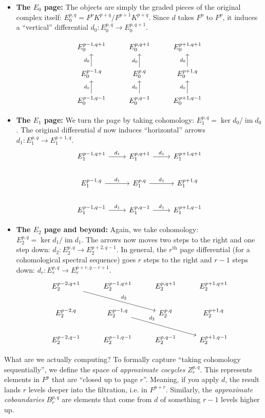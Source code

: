\documentclass[11pt]{article}
\newcommand{\image}{\operatorname{im}}
\theoremstyle{definition}
\numberwithin{theorem}{section} %
\numberwithin{equation}{section} %
\begin{document}
\begin{itemize}

\item \textbf{The $E_0$ page:} The objects are simply the graded pieces of the original complex itself: $E_0^{p,q} = F^pK^{p+q}/F^{p+1}K^{p+q}$. Since $d$ takes $F^p$ to $F^p$, it induces a ``vertical'' differential $d_0: E_0^{p,q} \to E_0^{p,q+1}$.

\[\begin{tikzcd}
E_0^{p-1, q+1} & E_0^{p, q+1} & E_0^{p+1, q+1} \\
E_0^{p-1, q} \arrow[u, "d_0"] & E_0^{p, q} \arrow[u, "d_0"] & E_0^{p+1, q} \arrow[u, "d_0"] \\
E_0^{p-1, q-1} \arrow[u, "d_0"] & E_0^{p, q-1} \arrow[u, "d_0"] & E_0^{p+1, q-1} \arrow[u, "d_0"]
\end{tikzcd}\]

\item \textbf{The $E_1$ page:} We turn the page by taking cohomology: $E_1^{p,q} = \ker d_0 / \image d_0$. The original differential $d$ now induces ``horizontal'' arrows $d_1: E_1^{p,q} \to E_1^{p+1, q}$. 
\[\begin{tikzcd}
E_1^{p-1, q+1} \arrow[r, "d_1"] & E_1^{p, q+1} \arrow[r, "d_1"] & E_1^{p+1, q+1} \\
E_1^{p-1, q} \arrow[r, "d_1"] & E_1^{p, q} \arrow[r, "d_1"] & E_1^{p+1, q} \\
E_1^{p-1, q-1} \arrow[r, "d_1"] & E_1^{p, q-1} \arrow[r, "d_1"] & E_1^{p+1, q-1}
\end{tikzcd}\]

\item \textbf{The $E_2$ page and beyond:} Again, we take cohomology: $E_2^{p,q} = \ker d_1 / \image d_1$. The arrows now moves two steps to the right and one step down: $d_2: E_2^{p,q} \to E_2^{p+2, q-1}$. In general, the $r^\text{th}$ page differential (for a cohomological spectral sequence) goes $r$ steps to the right and $r-1$ steps down: $d_r: E_r^{p,q} \to E_r^{p+r, q-r+1}$.
\[\begin{tikzcd}
E_2^{p-2, q+1} \arrow[drr, "d_2"] & E_2^{p-1, q+1} & E_2^{p, q+1} & E_2^{p+1, q+1} \\
E_2^{p-2, q} & E_2^{p-1, q} \arrow[drr, "d_2" near start] & E_2^{p, q} & E_2^{p+1, q} \\
E_2^{p-2, q-1} & E_2^{p-1, q-1} & E_2^{p, q-1} & E_2^{p+1, q-1}
\end{tikzcd}\]
\end{itemize}

\noindent What are we actually computing? To formally capture ``taking cohomology sequentially'', we define the space of \emph{approximate cocycles} $Z_r^{p,q}$. This represents elements in $F^p$ that are ``closed up to page $r$''. Meaning, if you apply $d$, the result lands $r$ levels deeper into the filtration, i.e. in $F^{p+r}$. Similarly, the \emph{approximate coboundaries} $B_r^{p,q}$ are elements that come from $d$ of something $r-1$ levels higher up.
\end{document}
